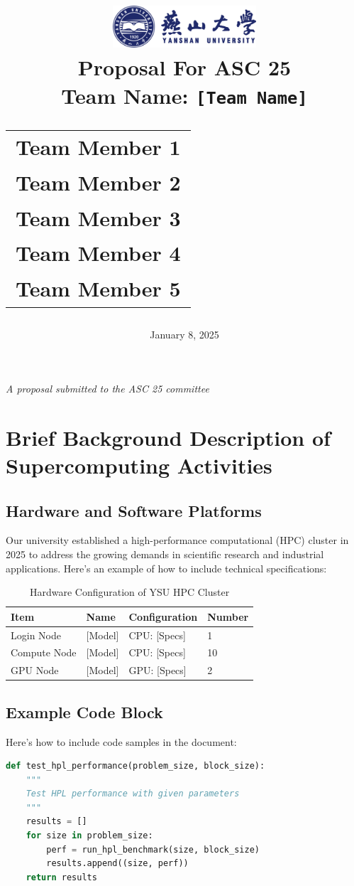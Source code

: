 \documentclass[a4paper,12pt]{article}
\title{
    \includegraphics[width=0.4\textwidth]{ysu-logo.png}\\[1cm] %
    {\LARGE Proposal For ASC 25}\\[0.5cm]
    \large Team Name: \texttt{[Team Name]}\\[1cm] %
    \begin{tabular}{c}
        \large Team Member 1 \\
        \large Team Member 2 \\
        \large Team Member 3 \\
        \large Team Member 4 \\
        \large Team Member 5
    \end{tabular}
}
\author{}
\date{\vfill January 8, 2025}
\begin{document}
\maketitle
\thispagestyle{empty}
\vfill
\begin{center}
    \textit{A proposal submitted to the ASC 25 committee}
\end{center}
\newpage

\tableofcontents
{}
\newpage

\section{Brief Background Description of Supercomputing Activities}

\subsection{Hardware and Software Platforms}
Our university established a high-performance computational (HPC) cluster in 2025 to address the growing demands in scientific research and industrial applications. Here's an example of how to include technical specifications:

\begin{table}[H]
\centering
\caption{Hardware Configuration of YSU HPC Cluster}
\begin{tabular}{llll}
\toprule
Item & Name & Configuration & Number \\
\midrule
Login Node & [Model] & CPU: [Specs] & 1 \\
Compute Node & [Model] & CPU: [Specs] & 10 \\
GPU Node & [Model] & GPU: [Specs] & 2 \\
\bottomrule
\end{tabular}
\end{table}

\subsection{Example Code Block}
Here's how to include code samples in the document:

\begin{lstlisting}[language=Python, caption=HPL Performance Testing Script]
def test_hpl_performance(problem_size, block_size):
    """
    Test HPL performance with given parameters
    """
    results = []
    for size in problem_size:
        perf = run_hpl_benchmark(size, block_size)
        results.append((size, perf))
    return results
\end{lstlisting}
\end{document}
